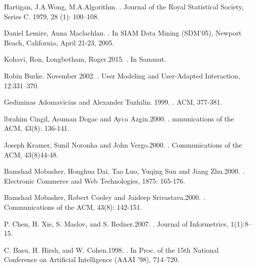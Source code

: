 \begin{thebibliography}{10}
Hartigan, J.A.Wong, M.A.Algorithm.
.
\newblock Journal of the Royal Statistical Society, Series C. 1979, 28 (1): 100–108.

Daniel Lemire, Anna Maclachlan.
.
\newblock In SIAM Data Mining (SDM'05), Newport Beach, California, April 21-23, 2005.

Kohavi, Ron, Longbotham, Roger.2015.
.
\newblock In Sammut.



Robin Burke. November 2002.
.
\newblock User Modeling and User-Adapted Interaction, 12:331–370.

Gediminas Adomavicius and Alexander Tuzhilin. 1999.
.
\newblock ACM, 377-381.

lbrahim Cingil, Asuman Dogac and Ayca Azgin.2000.
.
\newblock mmunications of the ACM, 43(8): 136-141.

Joseph Kramer, Sunil Noronha and John Vergo.2000.
.
\newblock Communications of the ACM, 43(8)44-48.

Bamshad Mobasher, Honghua Dai, Tao Luo, Yuqing Sun and Jiang Zhu.2000.
.
\newblock Electronic Commerce and Web Technologies, 1875: 165-176.

Bamshad Mobasher, Robert Cooley and Jaideep Srivastava.2000.
.
\newblock Communications of the ACM, 43(8): 142-151.

P. Chen, H. Xie, S. Maslov, and S. Redner.2007.
.
\newblock Journal of Informetrics, 1(1):8--15.

C. Basu, H. Hirsh, and W. Cohen.1998.
.
\newblock In Proc. of the 15th National Conference on Artificial Intelligence (AAAI ’98), 714–720.


\end{thebibliography}
